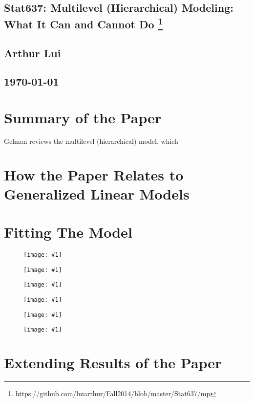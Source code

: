 \documentclass{article}
\def\beginmyfig{\begin{figure}[htbp]\begin{center}}
\def\endmyfig{\end{center}\end{figure}}
\def\myfig#1{\beginmyfig\texttt{[image: \#1]}\endmyfig}
\begin{document}
\begin{center}
  \section*{\textbf{Stat637: Multilevel (Hierarchical) Modeling: What It Can and Cannot Do}
    \footnote{https://github.com/luiarthur/Fall2014/blob/master/Stat637/mp}
  }  
  \subsection*{\textbf{Arthur Lui}}
  \subsection*{\noindent\today}
\end{center}

\section{Summary of the Paper}
Gelman reviews the multilevel (hierarchical) model, which 

\section{How the Paper Relates to Generalized Linear Models}

\section{Fitting The Model}
\myfig{images/apost.pdf}
\myfig{images/bpost.pdf}
\myfig{images/gpost.pdf}
\myfig{images/sy2post.pdf}
\myfig{images/sa2post.pdf}
\myfig{images/au.pdf}

\section{Extending Results of the Paper}
\end{document}
